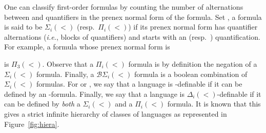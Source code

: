 \documentclass[envcountsame]{llncs}
\newcommand{\dew}[1]{\ensuremath{\Delta_{#1}(<)}\xspace}
\newcommand{\siw}[1]{\ensuremath{\Sigma_{#1}(<)}\xspace}
\newcommand{\piw}[1]{\ensuremath{\Pi_{#1}(<)}\xspace}
\newcommand{\bsw}[1]{\ensuremath{\mathcal{B}\Sigma_{#1}(<)}\xspace}
\newcommand{\piwt}{\ensuremath{\Pi_{3}(<)}\xspace}
\begin{document}
One can classify first-order formulas by counting the number of
alternations between  and  quantifiers in the prenex
normal form of the formula. Set , a formula is said to be
\siw{i} (resp.\ \piw{i}) if its prenex normal form has 
quantifier alternations (\emph{i.e.},  blocks of quantifiers) and starts
with an   (resp.\ ) quantification. For example, a
formula whose prenex normal form is

\noindent
is \piwt. Observe that a \piw{i} formula is by definition the negation of a
\siw{i} formula. Finally, a \bsw{i} formula is a boolean combination of
\siw{i} formulas. For  or , we say that a
language  is -definable if it can be defined by an -formula. Finally,
we say that a language is \dew{i}-definable if it can be defined by
\emph{both} a \siw{i} and a \piw{i} formula. It is known that this gives a
strict infinite hierarchy of classes of languages as represented in
Figure~\ref{fig:hiera}.
\end{document}
